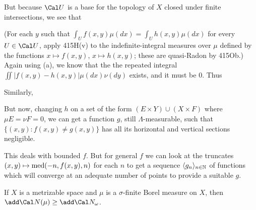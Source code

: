 {\noindent But because $\Cal U$ is a base for the topology of $X$ closed
under finite intersections, we see that


\noindent (For each $y$ such that
$\int_U f(x,y)\mu(dx)=\int_U h(x,y)\mu(dx)$ for every $U\in\Cal U$,
apply 415H(v) to the indefinite-integral measures
over $\mu$ defined by the functions $x\mapsto f(x,y)$, $x\mapsto h(x,y)$;
these are quasi-Radon by 415Ob.)   Again using (a), we know that the
the repeated integral $\iint|f(x,y)-h(x,y)|\mu(dx)\nu(dy)$ exists, and
it must be $0$.   Thus


Similarly,


\noindent But now, changing $h$ on a set of the form
$(E\times Y)\cup(X\times F)$ where $\mu E=\nu F=0$, we can get a function
$g$, still
$\Lambda$-measurable, such that
$\{(x,y):f(x,y)\ne g(x,y)\}$ has all its horizontal  and vertical
sections negligible.

\medskip

This deals with bounded $f$.   But for general $f$ we can look at the
truncates $(x,y)\mapsto\med(-n,f(x,y),\penalty-100n)$ for each $n$ to get a
sequence $\langle g_n\rangle_{n\in\Bbb N}$ of functions which will
converge at an adequate number of points to provide a suitable $g$.
}%

 If $X$ is a metrizable space and $\mu$
is a $\sigma$-finite Borel measure on $X$, then
$\add\Cal N(\mu)\ge\add\Cal N_{\omega}$.


